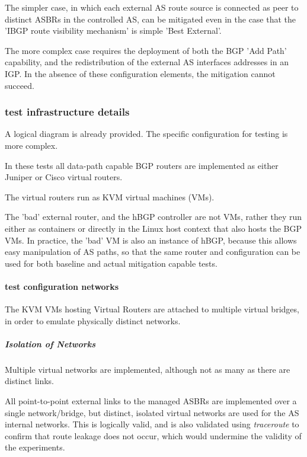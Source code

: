 The simpler case, in which each external AS route source is connected as peer to distinct ASBRs in the controlled AS, can be mitigated even in the case that the 'IBGP route visibility mechanism' is simple 'Best External'.

The more complex case requires the deployment of both the BGP 'Add Path' capability, and the redistribution of the external AS interfaces addresses in an IGP. In the absence of these configuration elements, the mitigation cannot succeed.

\subsubsection{test infrastructure details}

A logical diagram is already provided. The specific configuration for testing is more complex.

In these tests all data-path capable BGP routers are implemented as either Juniper or Cisco virtual routers.

The virtual routers run as KVM virtual machines (VMs).

The 'bad' external router, and the hBGP controller are not VMs, rather they run either as containers or directly in the Linux host context that also hosts the BGP VMs. In practice, the 'bad' VM is also an instance of hBGP, because this allows easy manipulation of AS paths, so that the same router and configuration can be used for both baseline and actual mitigation capable tests.

\paragraph{test configuration networks}

The KVM VMs hosting Virtual Routers are attached to multiple virtual bridges, in order to emulate physically distinct networks.

\subparagraph{Isolation of Networks}

Multiple virtual networks are implemented, although not as many as there are distinct links.

All point-to-point external links to the managed ASBRs are implemented over a single network/bridge, but distinct, isolated virtual networks are used for the AS internal networks.
This is logically valid, and is also validated using \textit{traceroute} to confirm that route leakage does not occur, which would undermine the validity of the experiments.

